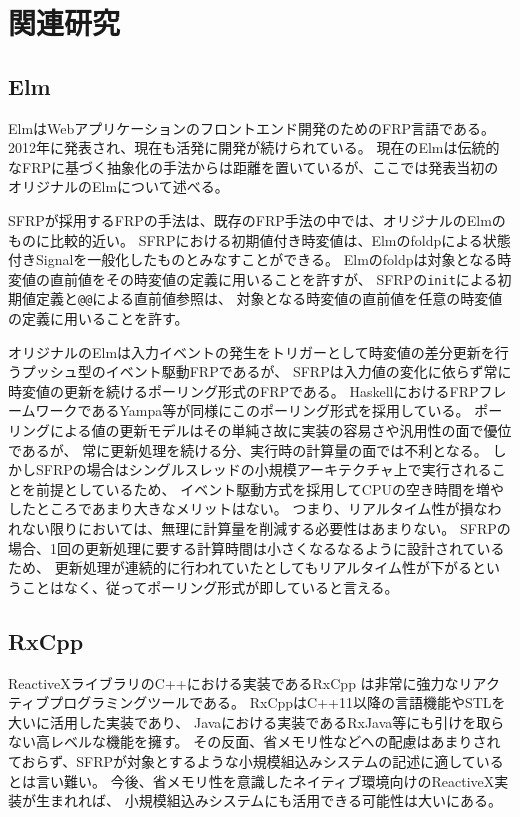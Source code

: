 \chapter{関連研究}
\section{Elm}
Elm\cite{czaplicki2012elm,czaplicki2013asynchronous}はWebアプリケーションのフロントエンド開発のためのFRP言語である。
2012年に発表され、現在も活発に開発が続けられている。
現在のElmは伝統的なFRPに基づく抽象化の手法からは距離を置いているが、ここでは発表当初のオリジナルのElmについて述べる。

SFRPが採用するFRPの手法は、既存のFRP手法の中では、オリジナルのElmのものに比較的近い。
SFRPにおける初期値付き時変値は、Elmのfoldpによる状態付きSignalを一般化したものとみなすことができる。
Elmのfoldpは対象となる時変値の直前値をその時変値の定義に用いることを許すが、
SFRPの\texttt{init}による初期値定義と\texttt{@@}による直前値参照は、
対象となる時変値の直前値を任意の時変値の定義に用いることを許す。

オリジナルのElmは入力イベントの発生をトリガーとして時変値の差分更新を行うプッシュ型のイベント駆動FRPであるが、
SFRPは入力値の変化に依らず常に時変値の更新を続けるポーリング形式のFRPである。
HaskellにおけるFRPフレームワークであるYampa\cite{hudak2003arrows}等が同様にこのポーリング形式を採用している。
ポーリングによる値の更新モデルはその単純さ故に実装の容易さや汎用性の面で優位であるが、
常に更新処理を続ける分、実行時の計算量の面では不利となる。
しかしSFRPの場合はシングルスレッドの小規模アーキテクチャ上で実行されることを前提としているため、
イベント駆動方式を採用してCPUの空き時間を増やしたところであまり大きなメリットはない。
つまり、リアルタイム性が損なわれない限りにおいては、無理に計算量を削減する必要性はあまりない。
SFRPの場合、1回の更新処理に要する計算時間は小さくなるなるように設計されているため、
更新処理が連続的に行われていたとしてもリアルタイム性が下がるということはなく、従ってポーリング形式が即していると言える。

\section{RxCpp}
ReactiveXライブラリ\cite{rxwebsite}のC++における実装であるRxCpp\cite{rxcppwebsite}
は非常に強力なリアクティブプログラミングツールである。
RxCppはC++11以降の言語機能やSTLを大いに活用した実装であり、
Javaにおける実装であるRxJava等にも引けを取らない高レベルな機能を擁す。
その反面、省メモリ性などへの配慮はあまりされておらず、SFRPが対象とするような小規模組込みシステムの記述に適しているとは言い難い。
今後、省メモリ性を意識したネイティブ環境向けのReactiveX実装が生まれれば、
小規模組込みシステムにも活用できる可能性は大いにある。


